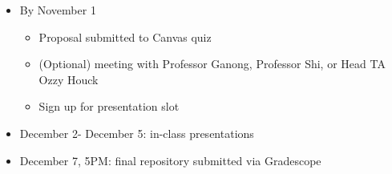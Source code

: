 \documentclass[
  letterpaper,
  DIV=11,
  numbers=noendperiod]{scrartcl}
\providecommand{\tightlist}{%
  \setlength{\itemsep}{0pt}\setlength{\parskip}{0pt}}\usepackage{longtable,booktabs,array}
\begin{document}
\begin{itemize}
\tightlist
\item
  By November 1

  \begin{itemize}
  \tightlist
  \item
    Proposal submitted to Canvas quiz
  \item
    (Optional) meeting with Professor Ganong, Professor Shi, or Head TA
    Ozzy Houck
  \item
    Sign up for presentation slot
  \end{itemize}
\item
  December 2- December 5: in-class presentations
\item
  December 7, 5PM: final repository submitted via Gradescope
\end{itemize}
\end{document}
